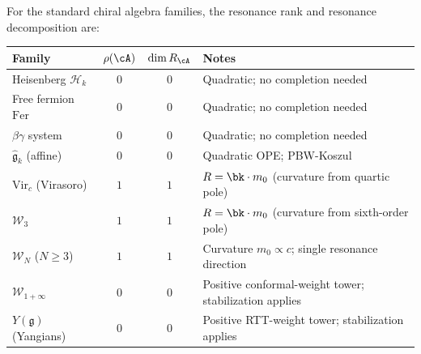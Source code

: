 \begin{proposition}
\label{prop:resonance-ranks-standard}
For the standard chiral algebra families, the resonance rank
and resonance decomposition are:
\begin{center}
\renewcommand{\arraystretch}{1.3}
\begin{tabular}{lccl}
\textbf{Family} & $\rho(\cA)$ & $\dim R_\cA$ & \textbf{Notes} \\
\hline
Heisenberg $\mathcal{H}_k$ & $0$ & $0$
  & Quadratic; no completion needed \\
Free fermion $\mathrm{Fer}$ & $0$ & $0$
  & Quadratic; no completion needed \\
$\beta\gamma$ system & $0$ & $0$
  & Quadratic; no completion needed \\
$\widehat{\mathfrak{g}}_k$ \textup{(}affine\textup{)} & $0$ & $0$
  & Quadratic OPE; PBW-Koszul \\
$\mathrm{Vir}_c$ \textup{(}Virasoro\textup{)} & $1$ & $1$
  & $R = \bk \cdot m_0$
    \textup{(}curvature from quartic pole\textup{)} \\
$\mathcal{W}_3$ & $1$ & $1$
  & $R = \bk \cdot m_0$
    \textup{(}curvature from sixth-order pole\textup{)} \\
$\mathcal{W}_N$ \textup{(}$N \ge 3$\textup{)} & $1$ & $1$
  & Curvature $m_0 \propto c$;
    single resonance direction \\
$\mathcal{W}_{1+\infty}$ & $0$ & $0$
  & Positive conformal-weight tower;
    stabilization applies \\
$Y(\mathfrak{g})$ \textup{(}Yangians\textup{)} & $0$ & $0$
  & Positive RTT-weight tower;
    stabilization applies
\end{tabular}
\end{center}
\end{proposition}

